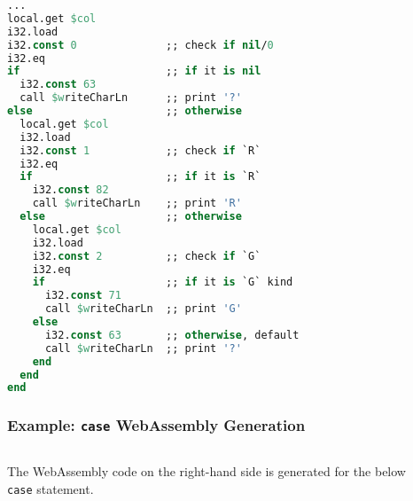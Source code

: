\documentclass{beamer}
\begin{document}
\begin{lrbox}{\caseGenWat}
\begin{lstlisting}[language=Pascal,basicstyle=\tiny]
...
local.get $col
i32.load
i32.const 0              ;; check if nil/0
i32.eq
if                       ;; if it is nil
  i32.const 63
  call $writeCharLn      ;; print '?'
else                     ;; otherwise
  local.get $col
  i32.load
  i32.const 1            ;; check if `R`
  i32.eq
  if                     ;; if it is `R`
    i32.const 82
    call $writeCharLn    ;; print 'R'
  else                   ;; otherwise
    local.get $col
    i32.load
    i32.const 2          ;; check if `G`
    i32.eq
    if                   ;; if it is `G` kind
      i32.const 71
      call $writeCharLn  ;; print 'G'
    else
      i32.const 63       ;; otherwise, default
      call $writeCharLn  ;; print '?'
    end
  end
end
\end{lstlisting}
\end{lrbox}


\begin{frame}
 \frametitle{Example: \texttt{case} WebAssembly Generation}
    \begin{columns}[T,onlytextwidth]
        \begin{column}{.40\textwidth}
            \begin{minipage}{\textwidth}
                {\footnotesize The WebAssembly code on the right-hand side is generated for the below \texttt{case} statement.}
                \ \\ \ \\ \ \\
                \usebox{\caseGenCode}
            \end{minipage}
        \end{column}
        \begin{column}{.55\textwidth}
            \begin{minipage}{\textwidth}
                \usebox{\caseGenWat}
            \end{minipage}
        \end{column}
    \end{columns}
\end{frame}
\end{document}
